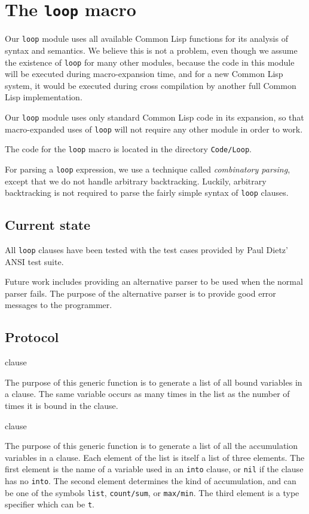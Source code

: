 \chapter{The \texttt{loop} macro} 

Our \texttt{loop} module uses all available Common Lisp functions for
its analysis of syntax and semantics.  We believe this is not a
problem, even though we assume the existence of \texttt{loop} for many
other modules, because the code in this module will be executed during
macro-expansion time, and for a new Common Lisp system, it would be
executed during cross compilation by another full Common Lisp
implementation.

Our \texttt{loop} module uses only standard Common Lisp code in its
expansion, so that macro-expanded uses of \texttt{loop} will not
require any other \sysname{} module in order to work.

The code for the \sysname{} \texttt{loop} macro is located in the
directory \texttt{Code/Loop}.  

For parsing a \texttt{loop} expression, we use a technique called
\emph{combinatory parsing}, except that we do not handle arbitrary
backtracking.  Luckily, arbitrary backtracking is not required to
parse the fairly simple syntax of \texttt{loop} clauses.

\section{Current state}

All \texttt{loop} clauses have been tested with the test cases
provided by Paul Dietz' ANSI \commonlisp{} test suite.

Future work includes providing an alternative parser to be used when
the normal parser fails.  The purpose of the alternative parser is to
provide good error messages to the programmer.

\section{Protocol}

 {clause}

The purpose of this generic function is to generate a list of all
bound variables in a clause.  The same variable occurs as many times
in the list as the number of times it is bound in the clause.

 {clause}

The purpose of this generic function is to generate a list of all the
accumulation variables in a clause.  Each element of the list is
itself a list of three elements.  The first element is the name of a
variable used in an \texttt{into} clause, or \texttt{nil} if the
clause has no \texttt{into}.  The second element determines the kind
of accumulation, and can be one of the symbols \texttt{list},
\texttt{count/sum}, or \texttt{max/min}.  The third element is a type
specifier which can be \texttt{t}.

